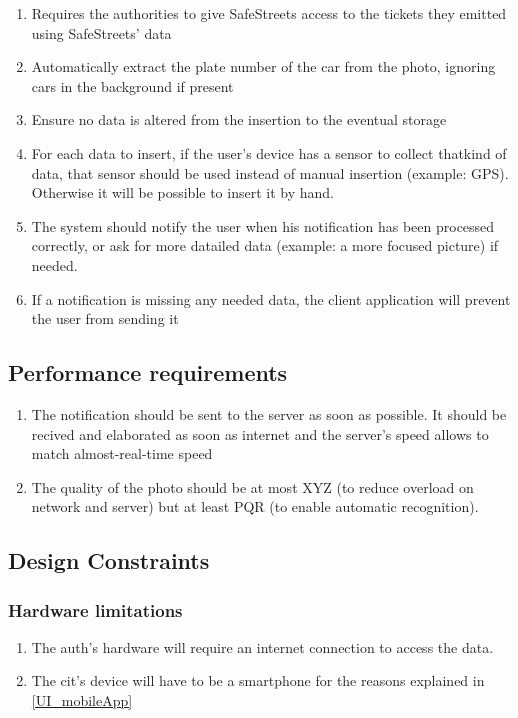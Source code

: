 \documentclass{article}
\newcommand{\enum}[1]{\texttt{#1.\arabic*}}
\begin{document}
			\begin{enumerate}[label=\enum{R}]
				\item \label{R_storeTickets}Requires the authorities to give SafeStreets access to the tickets they emitted using SafeStreets' data
				\item \label{R_autoPlate}Automatically extract the plate number of the car from the photo, ignoring cars in the background if present
				\item \label{R_unalteredData}Ensure no data is altered from the insertion to the eventual storage
				\item \label{R_dataGather}For each data to insert, if the  user's device has a sensor to collect thatkind of data, that sensor should be used instead of manual insertion (example: GPS). Otherwise it will be possible to insert it by hand.
				\item \label{R_notifyUser}The system should notify the user when his notification has been processed correctly, or ask for more datailed data (example: a more focused picture) if needed.
				\item \label{R_fullData}If a notification is missing any needed data, the client application will prevent the user from sending it
			\end{enumerate}
			
	\subsection{Performance requirements}
		\begin{enumerate}[label=\enum{P}]
			\item The notification should be sent to the server as soon as possible. It should be recived and elaborated as soon as internet and the server's speed allows to match almost-real-time speed
			\item The quality of the photo should be at most XYZ (to reduce overload on network and server) but at least PQR (to enable automatic recognition).
		\end{enumerate}
		
	\subsection{Design Constraints}
	
		\subsubsection{Hardware limitations} 
			\begin{enumerate}[label=\enum{SW}]
				\item The auth's hardware will require an internet connection to access the data.
				\item The cit's device will have to be a smartphone for the reasons explained in \ref{UI_mobileApp}
			\end{enumerate}					
		
\end{document}
